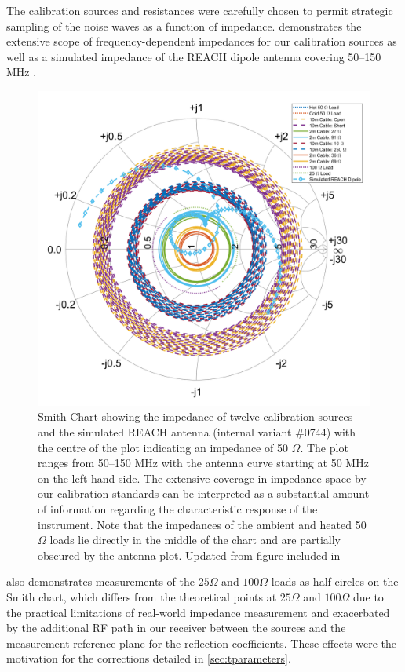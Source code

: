 The calibration sources and resistances were carefully chosen to permit strategic sampling of the noise waves as a function of impedance.  demonstrates the extensive scope of frequency-dependent impedances for our calibration sources as well as a simulated impedance of the REACH dipole antenna covering 50--150 MHz \citep{john_antenna}.
\begin{figure}
    \centering
    \includegraphics[scale=0.3]{smith}
    \caption{Smith Chart showing the impedance of twelve calibration sources and the simulated REACH antenna (internal variant \#0744) with the centre of the plot indicating an impedance of 50 $\Omega$. The plot ranges from 50--150 MHz with the antenna curve starting at 50 MHz on the left-hand side. The extensive coverage in impedance space by our calibration standards can be interpreted as a substantial amount of information regarding the characteristic response of the instrument. Note that the impedances of the ambient and heated 50 $\Omega$ loads lie directly in the middle of the chart and are partially obscured by the antenna plot. Updated from figure included in \citet{reach}}
    \label{fig:smith}
\end{figure}
 also demonstrates measurements of the $25 \Omega$ and $100 \Omega$ loads as half circles on the Smith chart, which differs from the theoretical points at $25 \Omega$ and $100 \Omega$ due to the practical limitations of real-world impedance measurement and exacerbated by the additional RF path in our receiver between the sources and the measurement reference plane for the reflection coefficients. These effects were the motivation for the corrections detailed in \cref{sec:tparameters}.

